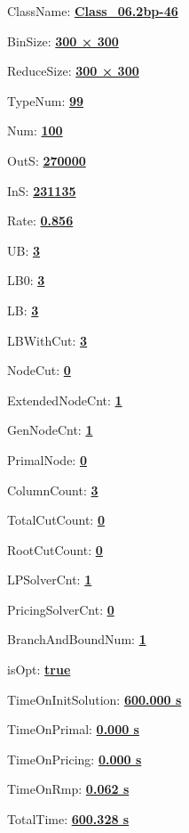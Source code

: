 \documentclass[11pt]{article}
\begin{document}
\pagestyle{empty}


ClassName: \underline{\textbf{Class_06.2bp-46}}
\par
BinSize: \underline{\textbf{300 × 300}}
\par
ReduceSize: \underline{\textbf{300 × 300}}
\par
TypeNum: \underline{\textbf{99}}
\par
Num: \underline{\textbf{100}}
\par
OutS: \underline{\textbf{270000}}
\par
InS: \underline{\textbf{231135}}
\par
Rate: \underline{\textbf{0.856}}
\par
UB: \underline{\textbf{3}}
\par
LB0: \underline{\textbf{3}}
\par
LB: \underline{\textbf{3}}
\par
LBWithCut: \underline{\textbf{3}}
\par
NodeCut: \underline{\textbf{0}}
\par
ExtendedNodeCnt: \underline{\textbf{1}}
\par
GenNodeCnt: \underline{\textbf{1}}
\par
PrimalNode: \underline{\textbf{0}}
\par
ColumnCount: \underline{\textbf{3}}
\par
TotalCutCount: \underline{\textbf{0}}
\par
RootCutCount: \underline{\textbf{0}}
\par
LPSolverCnt: \underline{\textbf{1}}
\par
PricingSolverCnt: \underline{\textbf{0}}
\par
BranchAndBoundNum: \underline{\textbf{1}}
\par
isOpt: \underline{\textbf{true}}
\par
TimeOnInitSolution: \underline{\textbf{600.000 s}}
\par
TimeOnPrimal: \underline{\textbf{0.000 s}}
\par
TimeOnPricing: \underline{\textbf{0.000 s}}
\par
TimeOnRmp: \underline{\textbf{0.062 s}}
\par
TotalTime: \underline{\textbf{600.328 s}}
\par
\newpage
\end{document}

